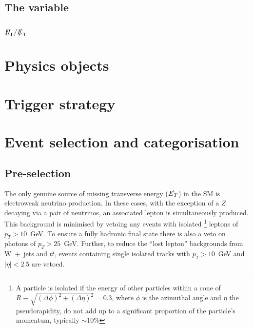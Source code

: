 \subsection{The \bdphi variable}




\subsection{$\MHT/\MET$}


\section{Physics objects} %






\section{Trigger strategy}





\section{Event selection and categorisation} %

\subsection{Pre-selection}

The only genuine source of missing transverse energy ($\cancel{E}_T$)
in the SM is electroweak neutrino production. In these cases, with the
exception of a $Z$ decaying via a pair of neutrinos, an associated
lepton is simultaneously produced. This background is minimised by
vetoing any events with isolated \footnote{A particle is isolated if
the energy of other particles within a cone of
$R\equiv\sqrt{(\Delta\phi)^2+(\Delta\eta)^2}=0.3$, where $\phi$ is the
azimuthal angle and $\eta$ the pseudorapidity, do not add up to a
significant proportion of the particle's momentum, typically
$\sim10$\%} leptons of $p_T>10$~GeV. To ensure a fully hadronic final
state there is also a veto on photons of $p_T>25$~GeV. Further, to
reduce the ``lost lepton'' backgrounds from W~+~jets and $t\bar{t}$,
events containing single isolated tracks with $p_T >10$~GeV and
$|\eta| < 2.5$ are vetoed.

